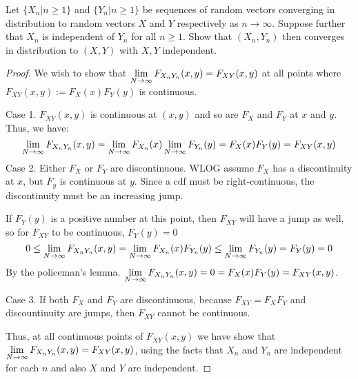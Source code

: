\documentclass[12pt, letterpaper]{paper}
\begin{document}
\begin{question}
  Let $\{ X_n | n \geq 1\}$ and $\{ Y_n | n \geq 1 \}$ be sequences of
  random vectors converging in distribution to random vectors $X$ and
  $Y$ respectively as $n \to \infty$. Suppose further that $X_n$ is
  independent of $Y_n$ for all $n \geq 1$. Show that $(X_n, Y_n)$ then
  converges in distribution to $(X,Y)$ with $X,Y$ independent.

  \begin{proof}
    We wish to show that $\lim\limits_{N \to \infty} F_{X_n Y_n}(x,y) = F_{XY}(x,y)$
    at all points where $F_{XY}(x,y) := F_X(x)F_Y(y)$ is continuous.

    Case 1. $F_{XY}(x,y)$ is continuous at $(x,y)$ and so are $F_X$ and $F_Y$ at $x$ and $y$. Thus, we have:
    \begin{equation*}
      \lim\limits_{N \to \infty} F_{X_n Y_n}(x,y) = \lim\limits_{N \to
        \infty}F_{X_n}(x)\lim\limits_{N \to \infty}F_{Y_n}(y) = F_X(x) F_Y(y) = F_{XY}(x,y)
    \end{equation*}
    Case 2. Either $F_X$ or $F_Y$ are discontinuous. WLOG assume $F_X$
    has a discontinuity at $x$, but $F_y$ is continuous at $y$. Since
    a cdf must be right-continuous, the discontinuity must be an increasing jump.

    If $F_Y(y)$ is a positive number at this point, then $F_{XY}$ will
    have a jump as well, so for $F_{XY}$ to be continuous, $F_Y(y) =0$
    \begin{equation*}
      0 \leq \lim\limits_{N \to \infty} F_{X_n Y_n}(x,y) = \lim_{N\rightarrow\infty}F_{X_n}(x)F_{Y_n}(y) \leq \lim\limits_{N\to\infty}F_{Y_n}(y) = F_Y(y) = 0
    \end{equation*}
    By the policeman's lemma. $\lim\limits_{N \to \infty}F_{X_n Y_n}(x,y) = 0
    = F_X(x) F_Y(y) = F_{XY}(x,y)$.

    Case 3. If both $F_X$ and $F_Y$ are discontinuous, because $F_{XY}=F_X F_Y$ and discountinuity are jumps, then $F_{XY}$ cannot be continuous.

    Thus, at all continuous points of $F_{XY}(x,y)$ we have show that
    $\lim\limits_{N \to \infty}F_{X_n Y_n}(x,y) = F_{XY}(x,y)$,  using the facts that $X_n$ and $Y_n$ are independent for each $n$ and also $X$ and $Y$ are independent.
  \end{proof}
\end{question}
\end{document}
